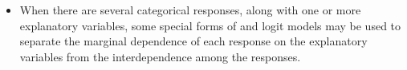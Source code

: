 \begin{itemize}
\item When there are several categorical responses, along with one or
more explanatory variables, some special forms of \loglin and logit
models may be used to separate the marginal dependence of each response
on the explanatory variables from the interdependence among the responses.


\end{itemize}

